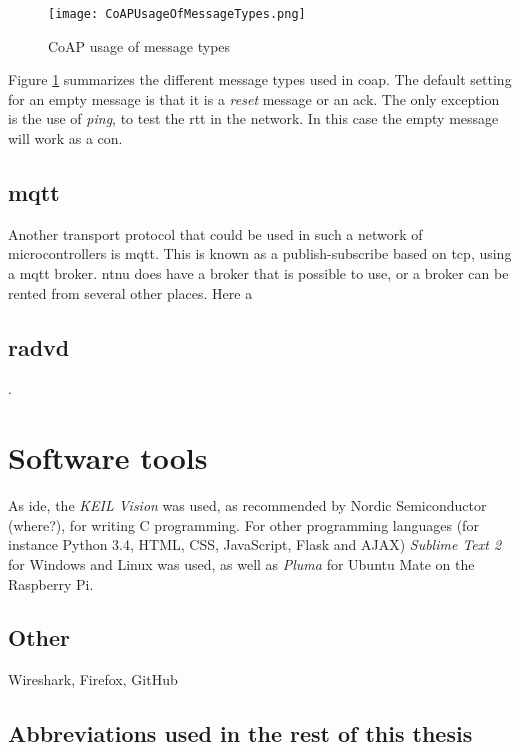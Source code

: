 \begin{figure}[ht]
    \centering
    \texttt{[image: CoAPUsageOfMessageTypes.png]}    
    \caption{CoAP usage of message types}
    \label{fig:CoAPUsageOfMessageTypes}
\end{figure}

Figure \ref{fig:CoAPUsageOfMessageTypes} summarizes the different message types used in \gls{coap}. The default setting for an empty message is that it is a \textit{reset} message or an \gls{ack}. The only exception is the use of \textit{ping}, to test the \gls{rtt} in the network. In this case the empty message will work as a \gls{con}.

\subsection{\gls{mqtt}}

Another transport protocol that could be used in such a network of microcontrollers is \gls{mqtt}. This is  known as a publish-subscribe based on \gls{tcp}, using a \gls{mqtt} broker. \gls{ntnu} does have a broker that is possible to use, or a broker can be rented from several other places. Here a 

\cite{hunkeler2008mqtt}

\subsection{\gls{radvd}}

\cite{chown2011rogue}. 


\section{Software tools}


As \gls{ide}, the \textit{KEIL Vision} was used, as recommended by Nordic Semiconductor (where?), for writing C programming. For other programming languages (for instance Python 3.4, HTML, CSS, JavaScript, Flask and AJAX) \textit{Sublime Text 2} for Windows and Linux was used, as well as \textit{Pluma} for Ubuntu Mate on the Raspberry Pi. 

\subsection{Other}

Wireshark, Firefox, GitHub


\subsection{Abbreviations used in the rest of this thesis}




